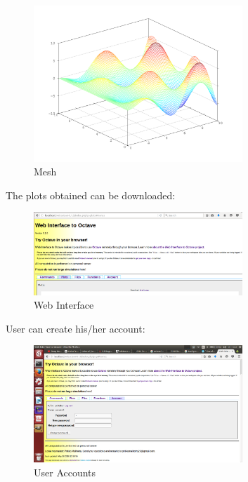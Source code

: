  \begin{figure}[!ht]
 	\centering
 	\includegraphics[width=0.7\textwidth]{images/plot1.png}                
 	\caption{Mesh}
 	\hspace{-1.5em}
 \end{figure}
 
 The plots obtained can be downloaded:\\
 \begin{figure}[!ht]
 	\centering
 	\includegraphics[width=0.7\textwidth]{images/download.png}                
 	\caption{Web Interface}
 	\hspace{-1.5em}
 \end{figure}
 \newpage
 User can create his/her account:
 \begin{figure}[!ht]
 	\centering
 	\includegraphics[width=0.7\textwidth]{images/account.png}                
 	\caption{User Accounts}
 	\hspace{-1.5em}
 \end{figure}
 
 
 
 
 